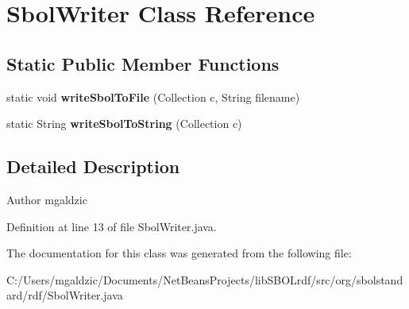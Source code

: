 \hypertarget{classorg_1_1sbolstandard_1_1rdf_1_1_sbol_writer}{
\section{SbolWriter Class Reference}
\label{classorg_1_1sbolstandard_1_1rdf_1_1_sbol_writer}
}
\subsection*{Static Public Member Functions}
\begin{DoxyCompactItemize}
\item 
\hypertarget{classorg_1_1sbolstandard_1_1rdf_1_1_sbol_writer_a310a3f0aa2500560453ba8be6db086dd}{
static void {\bfseries writeSbolToFile} (Collection c, String filename)}
\label{classorg_1_1sbolstandard_1_1rdf_1_1_sbol_writer_a310a3f0aa2500560453ba8be6db086dd}

\item 
\hypertarget{classorg_1_1sbolstandard_1_1rdf_1_1_sbol_writer_a64630eea69d44c0176552272c8cbcf57}{
static String {\bfseries writeSbolToString} (Collection c)}
\label{classorg_1_1sbolstandard_1_1rdf_1_1_sbol_writer_a64630eea69d44c0176552272c8cbcf57}

\end{DoxyCompactItemize}


\subsection{Detailed Description}
\begin{DoxyAuthor}{Author}
mgaldzic 
\end{DoxyAuthor}


Definition at line 13 of file SbolWriter.java.



The documentation for this class was generated from the following file:\begin{DoxyCompactItemize}
\item 
C:/Users/mgaldzic/Documents/NetBeansProjects/libSBOLrdf/src/org/sbolstandard/rdf/SbolWriter.java\end{DoxyCompactItemize}
